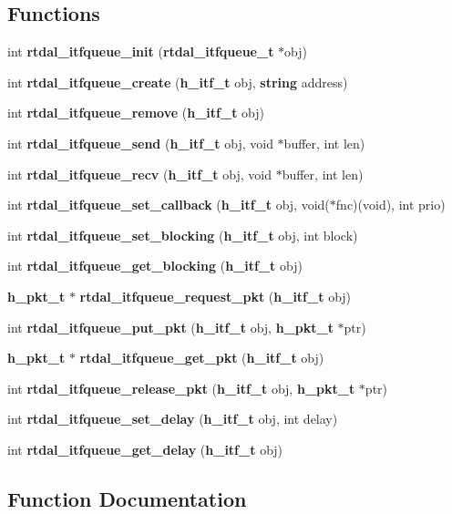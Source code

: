 \subsection*{Functions}
\begin{DoxyCompactItemize}
\item 
int {\bf rtdal\-\_\-itfqueue\-\_\-init} ({\bf rtdal\-\_\-itfqueue\-\_\-t} $\ast$obj)
\item 
int {\bf rtdal\-\_\-itfqueue\-\_\-create} ({\bf h\-\_\-itf\-\_\-t} obj, {\bf string} address)
\item 
int {\bf rtdal\-\_\-itfqueue\-\_\-remove} ({\bf h\-\_\-itf\-\_\-t} obj)
\item 
int {\bf rtdal\-\_\-itfqueue\-\_\-send} ({\bf h\-\_\-itf\-\_\-t} obj, void $\ast$buffer, int len)
\item 
int {\bf rtdal\-\_\-itfqueue\-\_\-recv} ({\bf h\-\_\-itf\-\_\-t} obj, void $\ast$buffer, int len)
\item 
int {\bf rtdal\-\_\-itfqueue\-\_\-set\-\_\-callback} ({\bf h\-\_\-itf\-\_\-t} obj, void($\ast$fnc)(void), int prio)
\item 
int {\bf rtdal\-\_\-itfqueue\-\_\-set\-\_\-blocking} ({\bf h\-\_\-itf\-\_\-t} obj, int block)
\item 
int {\bf rtdal\-\_\-itfqueue\-\_\-get\-\_\-blocking} ({\bf h\-\_\-itf\-\_\-t} obj)
\item 
{\bf h\-\_\-pkt\-\_\-t} $\ast$ {\bf rtdal\-\_\-itfqueue\-\_\-request\-\_\-pkt} ({\bf h\-\_\-itf\-\_\-t} obj)
\item 
int {\bf rtdal\-\_\-itfqueue\-\_\-put\-\_\-pkt} ({\bf h\-\_\-itf\-\_\-t} obj, {\bf h\-\_\-pkt\-\_\-t} $\ast$ptr)
\item 
{\bf h\-\_\-pkt\-\_\-t} $\ast$ {\bf rtdal\-\_\-itfqueue\-\_\-get\-\_\-pkt} ({\bf h\-\_\-itf\-\_\-t} obj)
\item 
int {\bf rtdal\-\_\-itfqueue\-\_\-release\-\_\-pkt} ({\bf h\-\_\-itf\-\_\-t} obj, {\bf h\-\_\-pkt\-\_\-t} $\ast$ptr)
\item 
int {\bf rtdal\-\_\-itfqueue\-\_\-set\-\_\-delay} ({\bf h\-\_\-itf\-\_\-t} obj, int delay)
\item 
int {\bf rtdal\-\_\-itfqueue\-\_\-get\-\_\-delay} ({\bf h\-\_\-itf\-\_\-t} obj)
\end{DoxyCompactItemize}


\subsection{Function Documentation}
